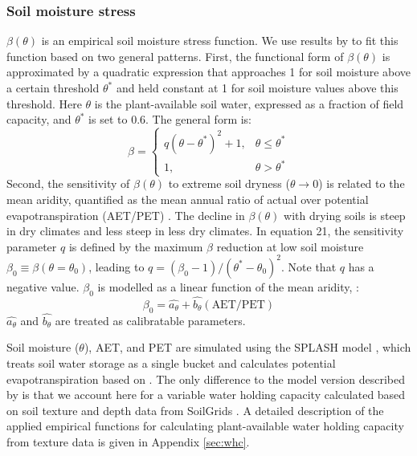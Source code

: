 \documentclass[gmd, manuscript]{copernicus}
\begin{document}
\subsubsection{Soil moisture stress}
\label{sec:soilmstress}
$\beta(\theta)$ is an empirical soil moisture stress function. We use results by \citet{stocker18newphyt} to fit this function based on two general patterns. First, the functional form of $\beta(\theta)$ is approximated by a quadratic expression that approaches 1 for soil moisture above a certain threshold $\theta^{\ast}$ and held constant at 1 for soil moisture values above this threshold. Here $\theta$ is the plant-available soil water, expressed as a fraction of field capacity, and $\theta^{\ast}$ is set to 0.6. The general form is:
\begin{equation}
\label{eq:soilmstress}
    \beta =
\begin{cases}
    q(\theta - \theta^{\ast})^2 + 1,& \theta \leq \theta^{\ast}\\
    1,              & \theta > \theta^{\ast}
\end{cases}
\end{equation}
Second, the sensitivity of $\beta(\theta)$ to extreme soil dryness ($\theta \rightarrow 0$) is related to the mean aridity, quantified as the mean annual ratio of actual over potential evapotranspiration (AET/PET) \citep{stocker18newphyt}. The decline in $\beta(\theta)$ with drying soils is steep in dry climates and less steep in less dry climates. In equation 21, the sensitivity parameter $q$ is defined by the maximum $\beta$ reduction at low soil moisture $\beta_0\equiv\beta(\theta=\theta_0)$, leading to $q=(\beta_0-1)/(\theta^{\ast}-\theta_0)^2$. Note that $q$ has a negative value. $\beta_0$ is modelled as a linear function of the mean aridity, :
\begin{equation}
\label{eq:soilmsensitivity}
\beta_0 = \widehat{a_{\theta}} + \widehat{b_{\theta}} (\text{AET}/\text{PET})
\end{equation}
$\widehat{a_{\theta}}$ and $\widehat{b_{\theta}}$ are treated as calibratable parameters. 

Soil moisture ($\theta$), AET, and PET are simulated using the SPLASH model \citep{davis17}, which treats soil water storage as a single bucket and calculates potential evapotranspiration based on \citet{priestleytaylor72}. The only difference to the model version described by \citep{davis17} is that we account here for a variable water holding capacity calculated based on soil texture and depth data from SoilGrids \citep{Hengl2014-jm}. A detailed description of the applied empirical functions for calculating plant-available water holding capacity from texture data is given in Appendix \ref{sec:whc}.
\end{document}
